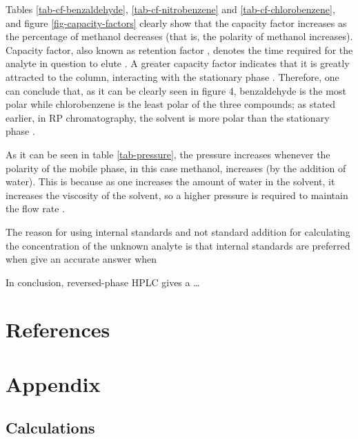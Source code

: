 \documentclass[a4paper, 12pt]{article}
\begin{document}
Tables \ref{tab-cf-benzaldehyde}, \ref{tab-cf-nitrobenzene} and \ref{tab-cf-chlorobenzene}, and figure \ref{fig-capacity-factors} clearly show that the capacity factor increases as the percentage of methanol decreases (that is, the polarity of methanol increases). Capacity factor, also known as retention factor \cite{harris}, denotes the time required for the analyte in question to elute \cite{harris}. A greater capacity factor indicates that it is greatly attracted to the column, interacting with the stationary phase \cite{harris}. Therefore, one can conclude that, as it can be clearly seen in figure 4, benzaldehyde is the most polar while chlorobenzene is the least polar of the three compounds; as stated earlier, in RP chromatography, the solvent is more polar than the stationary phase \cite{harris}.

As it can be seen in table \ref{tab-pressure}, the pressure increases whenever the polarity of the mobile phase, in this case methanol, increases (by the addition of water). This is because as one increases the amount of water in the solvent, it increases the viscosity of the solvent, so a higher pressure is required to maintain the flow rate \cite{harris}.


The reason for using internal standards and not standard addition for calculating the concentration of the unknown analyte is that internal standards are preferred when give an accurate answer when 

In conclusion, reversed-phase HPLC gives a \dots


\section{References}
\printbibliography


\section{Appendix}

\subsection{Calculations}
\end{document}
